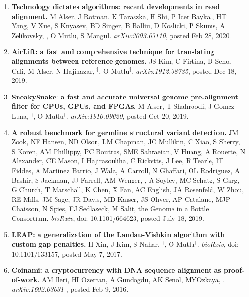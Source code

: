 \begin{enumerate}
 
\item
{\bf Technology dictates algorithms: recent developments in read alignment.}
M Alser, J Rotman, K Taraszka, H Shi, P Icer Baykal, HT Yang, V Xue, S Knyazev, BD Singer, B Balliu, D Koslicki, P Skums, A Zelikovsky, \calkan{}, O Mutlu, S Mangul.
{\it arXiv:2003.00110}, posted Feb 28, 2020.
   
\item
{\bf AirLift: a fast and comprehensive technique for translating alignments between reference genomes.} JS Kim, C Firtina, D Senol Cali, M Alser, N Hajinazar, \calkan{}$^\ddag$, O Mutlu$^\ddag$. {\it arXiv:1912.08735}, posted Dec 18, 2019.

\item
{\bf SneakySnake: a fast and accurate universal genome pre-alignment filter for CPUs, GPUs, and FPGAs.} M Alser, T Shahroodi, J Gomez-Luna, \calkan{}$^\ddag$, O Mutlu$^\ddag$. {\it arXiv:1910.09020}, posted Oct 20, 2019.

\item
{\bf A robust benchmark for germline structural variant detection.} JM Zook, NF Hansen, ND Olson, LM Chapman,  JC Mullikin, C Xiao, S Sherry, S Koren, AM Phillippy,  PC Boutros, SME Sahraeian, V Huang, A Rouette, N Alexander, CE Mason, I Hajirasouliha, C Ricketts, J Lee, R Tearle, IT Fiddes, A Martinez Barrio, J Wala, A Carroll, N Ghaffari, OL Rodriguez, A Bashir,  S Jackman, JJ Farrell, AM Wenger,  \calkan{}, A Soylev, MC Schatz, S Garg, G Church, T Marschall, K Chen, X Fan, AC English, JA Rosenfeld, W Zhou, RE Mills, JM Sage, JR Davis, MD Kaiser, JS Oliver, AP Catalano, MJP Chaisson, N Spies, FJ Sedlazeck, M Salit, the Genome in a Bottle Consortium.
{\it bioRxiv}, doi: 10.1101/664623, posted July 18, 2019.


\item
 {\bf LEAP: a generalization of the Landau-Vishkin algorithm with custom gap penalties.}
 H Xin, J Kim, S Nahar, \calkan{}$^\ddag$, O Mutlu$^\ddag$.
{\it bioRxiv}, doi: 10.1101/133157, posted May 7, 2017.

\item
 {\bf  Coinami: a cryptocurrency with DNA sequence alignment as proof-of-work.}
 AM Ileri, HI Ozercan, A Gundogdu, AK Senol, MYOzkaya, \calkan{}.
{\it arXiv:1602.03031} , posted Feb 9, 2016.

\end{enumerate}

\clearpage
\vspace{-.4cm}

